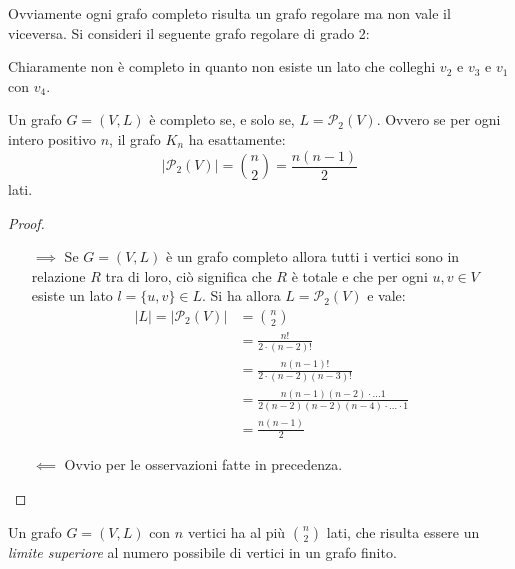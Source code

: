 \begin{osservation}
	Ovviamente ogni grafo completo risulta un grafo regolare ma non vale il viceversa. Si consideri il seguente grafo regolare di grado 2:
	\begin{center}
	\end{center}
Chiaramente non è completo in quanto non esiste un lato che colleghi $v_{2}$ e $v_{3}$ e $v_{1}$ con $v_{4}$. 
\end{osservation}

\begin{propbox}
	Un grafo $G=(V,L)$ è completo se, e solo se, $L=\mathcal{P}_{2}(V)$. Ovvero se per ogni intero positivo $n$, il grafo $K_{n}$ ha esattamente:
\begin{displaymath}
    |\mathcal{P}_{2}(V)| = \binom{n}{2} = \frac{n(n-1)}{2}
\end{displaymath}
lati.
\end{propbox}
\begin{proof}
	\begin{itemize}
		\item[$\implies$] Se $G=(V,L)$ è un grafo completo allora tutti i vertici sono in relazione $R$ tra di loro, ciò significa che $R$ è totale e che per ogni $u,v \in V$ esiste un lato $l=\{u,v\} \in L$. Si ha allora $L=\mathcal{P}_{2}(V)$ e vale:
		\begin{align*}
			|L| = |\mathcal{P}_{2}(V)| &= \binom{n}{2} \\
			&= \frac{n!}{2 \cdot (n-2)!} \\
			&= \frac{n (n-1)!}{2 \cdot (n-2)(n-3)!} \\
			&= \frac{n (n-1)(n-2)\cdot \ldots 1}{2(n-2)(n-2)(n-4)\cdot \ldots \cdot 1}\\
			&= \frac{n(n-1)}{2}
		\end{align*}
	\item[$\impliedby$] Ovvio per le osservazioni fatte in precedenza.
	\end{itemize}
\end{proof}
\begin{corolbox}
	Un grafo $G=(V,L)$ con $n$ vertici ha al più $\binom{n}{2}$ lati, che risulta essere un \textit{limite superiore} al numero possibile di vertici in un grafo finito.
\end{corolbox}

